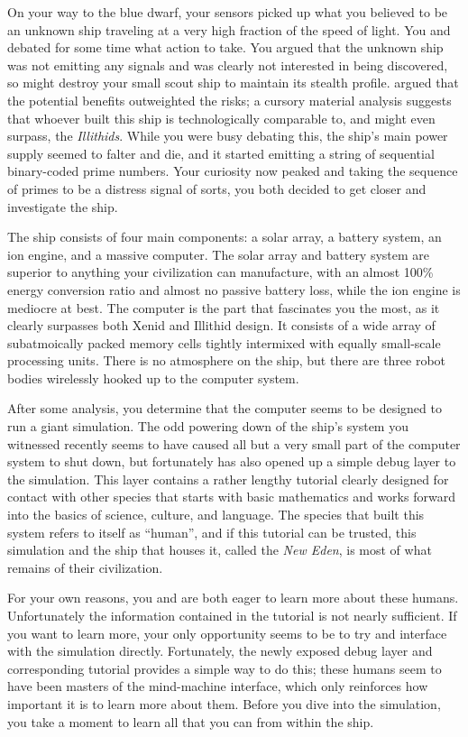 \documentclass[char]{guildcamp1}
\begin{document}
On your way to the blue dwarf, your sensors picked up what you believed to be an unknown ship traveling at a very high fraction of the speed of light. You and \cActive{\name} debated for some time what action to take. You argued that the unknown ship was not emitting any signals and was clearly not interested in being discovered, so might destroy your small scout ship to maintain its stealth profile. \cActive{\name} argued that the potential benefits outweighted the risks; a cursory material analysis suggests that whoever built this ship is technologically comparable to, and might even surpass, the \emph{Illithids}. While you were busy debating this, the ship's main power supply seemed to falter and die, and it started emitting a string of sequential binary-coded prime numbers. Your curiosity now peaked and taking the sequence of primes to be a distress signal of sorts, you both decided to get closer and investigate the ship.

The ship consists of four main components: a solar array, a battery system, an ion engine, and a massive computer. The solar array and battery system are superior to anything your civilization can manufacture, with an almost 100\% energy conversion ratio and almost no passive battery loss, while the ion engine is mediocre at best. The computer is the part that fascinates you the most, as it clearly surpasses both Xenid and Illithid design. It consists of a wide array of subatmoically packed memory cells tightly intermixed with equally small-scale processing units. There is no atmosphere on the ship, but there are three robot bodies wirelessly hooked up to the computer system.

After some analysis, you determine that the computer seems to be designed to run a giant simulation. The odd powering down of the ship's system you witnessed recently seems to have caused all but a very small part of the computer system to shut down, but fortunately has also opened up a simple debug layer to the simulation. This layer contains a rather lengthy tutorial clearly designed for contact with other species that starts with basic mathematics and works forward into the basics of science, culture, and language. The species that built this system refers to itself as ``human'', and if this tutorial can be trusted, this simulation and the ship that houses it, called the \emph{New Eden}, is most of what remains of their civilization.

For your own reasons, you and \cActive{\name} are both eager to learn more about these humans. Unfortunately the information contained in the tutorial is not nearly sufficient. If you want to learn more, your only opportunity seems to be to try and interface with the simulation directly. Fortunately, the newly exposed debug layer and corresponding tutorial provides a simple way to do this; these humans seem to have been masters of the mind-machine interface, which only reinforces how important it is to learn more about them. Before you dive into the simulation, you take a moment to learn all that you can from within the ship.
\end{document}

